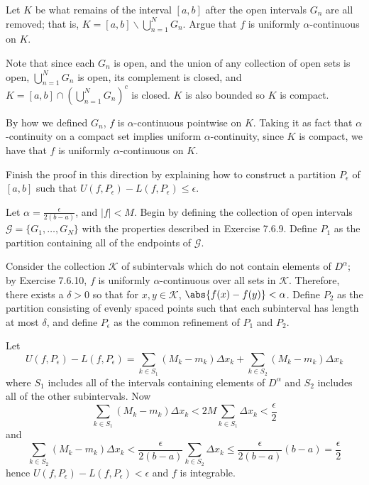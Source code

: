 \begin{exercise}
Let \(K\) be what remains of the interval \([a,b]\) after the open intervals \(G_n\) are all removed; that is, \(K = [a,b]\backslash \bigcup^N_{n=1} G_n\). Argue that \(f\) is uniformly \(\alpha\)-continuous on \(K\).
\end{exercise}
\begin{solution}
    Note that since each \(G_n\) is open, and the union of any collection of open sets is open, \(\bigcup^N_{n=1} G_n\) is open, its complement is closed, and \(K = [a,b] \cap (\bigcup^N_{n=1} G_n)^c\) is closed. \(K\) is also bounded so \(K\) is compact.

    By how we defined \(G_n\), \(f\) is \(\alpha\)-continuous pointwise on \(K\). Taking it as fact that \(\alpha\)-continuity on a compact set implies uniform \(\alpha\)-continuity, since \(K\) is compact, we have that \(f\) is uniformly \(\alpha\)-continuous on \(K\).
\end{solution}

\begin{exercise}
Finish the proof in this direction by explaining how to construct a partition \(P_\epsilon\) of \([a,b]\) such that \(U(f,P_\epsilon) - L(f, P_\epsilon) \leq \epsilon\).
\end{exercise}
\begin{solution}
Let \(\alpha = \frac{\epsilon}{2(b-a)}\), and \(|f| < M\). Begin by defining the collection of open intervals \(\mathcal{G} = \{G_1, \dots, G_N\}\) with the properties described in Exercise 7.6.9. Define \(P_1\) as the partition containing all of the endpoints of \(\mathcal{G}\).

Consider the collection \(\mathcal{K}\) of subintervals which do not contain elements of \(D^\alpha\); by Exercise 7.6.10, \(f\) is uniformly \(\alpha\)-continuous over all sets in \(\mathcal{K}\). Therefore, there exists a \(\delta > 0\) so that for \(x, y \in \mathcal{K}\), \(\abs{f(x) - f(y)} < \alpha\). Define \(P_2\) as the partition consisting of evenly spaced points such that each subinterval has length at most \(\delta\), and define \(P_\epsilon\) as the common refinement of \(P_1\) and \(P_2\).

Let
\[U(f,P_\epsilon) - L(f, P_\epsilon) = \sum_{k \in S_1} (M_k - m_k) \Delta x_k + \sum_{k \in S_2} (M_k - m_k) \Delta x_k \]
where \(S_1\) includes all of the intervals containing elements of \(D^\alpha\) and \(S_2\) includes all of the other subintervals. Now
\[\sum_{k \in S_1} (M_k - m_k) \Delta x_k < 2M \sum_{k \in S_1} \Delta x_k < \frac{\epsilon}{2} \]
and
\[\sum_{k \in S_2} (M_k - m_k) \Delta x_k < \frac{\epsilon}{2(b-a)}\sum_{k \in S_2} \Delta x_k \leq \frac{\epsilon}{2(b-a)} (b-a) = \frac{\epsilon}{2} \]
hence \(U(f, P_\epsilon) - L(f, P_\epsilon) < \epsilon\) and \(f\) is integrable.
\end{solution}

